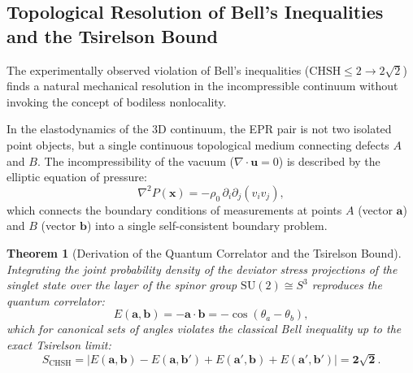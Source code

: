 \documentclass[12pt,a4paper]{article}
\newtheorem{theorem}{Theorem}
\begin{document}
\subsection{Topological Resolution of Bell's Inequalities and the Tsirelson Bound}
										
	The experimentally observed violation of Bell's inequalities ($\text{CHSH} \le 2 \to 2\sqrt{2}$) finds a natural mechanical resolution in the incompressible continuum without invoking the concept of bodiless nonlocality.
										
	In the elastodynamics of the 3D continuum, the EPR pair is not two isolated point objects, but a single continuous topological medium connecting defects $A$ and $B$. The incompressibility of the vacuum ($\nabla \cdot \mathbf{u} = 0$) is described by the elliptic equation of pressure:
	\begin{equation}
	\nabla^2 P(\mathbf{x}) = -\rho_0 \, \partial_i \partial_j \left( v_i v_j \right),
	\end{equation}
	which connects the boundary conditions of measurements at points $A$ (vector $\mathbf{a}$) and $B$ (vector $\mathbf{b}$) into a single self-consistent boundary problem.
					
	\begin{theorem}[Derivation of the Quantum Correlator and the Tsirelson Bound]
	Integrating the joint probability density of the deviator stress projections of the singlet state over the layer of the spinor group $\mathrm{SU}(2) \cong S^3$ reproduces the quantum correlator:
	\begin{equation}
	E(\mathbf{a}, \mathbf{b}) = -\mathbf{a} \cdot \mathbf{b} = -\cos(\theta_a - \theta_b),
	\end{equation}
	which for canonical sets of angles violates the classical Bell inequality up to the exact Tsirelson limit:
	\begin{equation}
	S_{\mathrm{CHSH}} = \left| E(\mathbf{a}, \mathbf{b}) - E(\mathbf{a}, \mathbf{b}') + E(\mathbf{a}', \mathbf{b}) + E(\mathbf{a}', \mathbf{b}') \right| = \mathbf{2\sqrt{2}}.
	\end{equation}
	\end{theorem}
							
\end{document}
